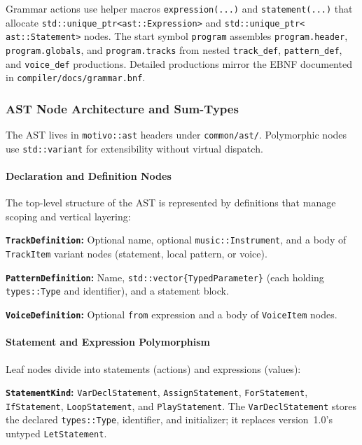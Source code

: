 Grammar actions use helper macros \texttt{expression(...)} and \texttt{statement(...)} that allocate
\texttt{std::unique\_ptr\textless ast::Expression\textgreater{}} and \texttt{std::unique\_ptr\textless
ast::Statement\textgreater{}} nodes.
The start symbol \texttt{program} assembles \texttt{program.header}, \texttt{program.globals}, and
\texttt{program.tracks} from nested \texttt{track\_def}, \texttt{pattern\_def}, and \texttt{voice\_def} productions.
Detailed productions mirror the EBNF documented in \texttt{compiler/docs/grammar.bnf}.

\subsubsection{AST Node Architecture and Sum-Types}

The AST lives in \texttt{motivo::ast} headers under \texttt{common/ast/}.
Polymorphic nodes use \texttt{std::variant} for extensibility without virtual dispatch.

\paragraph{Declaration and Definition Nodes}
The top-level structure of the AST is represented by definitions that manage scoping and vertical layering:

\noindent \textbf{\texttt{TrackDefinition}:} Optional name, optional \texttt{music::Instrument}, and a body of
\texttt{TrackItem} variant nodes (statement, local pattern, or voice).

\noindent \textbf{\texttt{PatternDefinition}:} Name, \texttt{std::vector\{TypedParameter\}} (each holding
\texttt{types::Type} and identifier), and a statement block.

\noindent \textbf{\texttt{VoiceDefinition}:} Optional \texttt{from} expression and a body of \texttt{VoiceItem} nodes.

\paragraph{Statement and Expression Polymorphism}
Leaf nodes divide into statements (actions) and expressions (values):

\noindent \textbf{\texttt{StatementKind}:} \texttt{VarDeclStatement}, \texttt{AssignStatement}, \texttt{ForStatement},
\texttt{IfStatement}, \texttt{LoopStatement}, and \texttt{PlayStatement}.
The \texttt{VarDeclStatement} stores the declared \texttt{types::Type}, identifier, and initializer; it replaces
version~1.0's untyped \texttt{LetStatement}.

